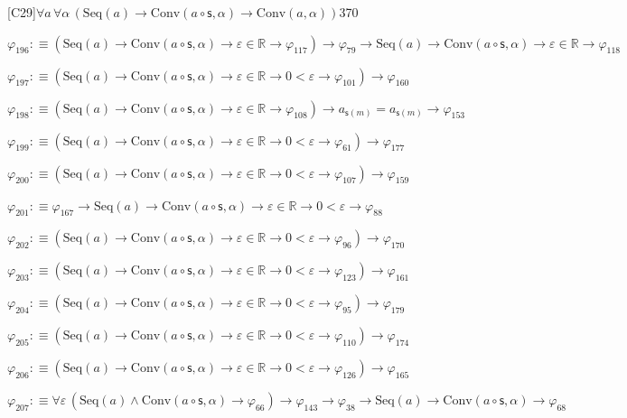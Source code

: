 \begin{fullproof}{[C29]}{$\forall a\,\forall \alpha\,(\mathrm{Seq}(a) \to \mathrm{Conv}(a \circ \mathsf{s},\alpha) \to \mathrm{Conv}(a,\alpha))$}{370}
\begin{abbrevlist}
\item $\varphi_{196} :\equiv (\mathrm{Seq}(a) \to \mathrm{Conv}(a \circ \mathsf{s},\alpha) \to \varepsilon \in \mathbb{R} \to \varphi_{117}) \to \varphi_{79} \to \mathrm{Seq}(a) \to \mathrm{Conv}(a \circ \mathsf{s},\alpha) \to \varepsilon \in \mathbb{R} \to \varphi_{118}$
\item $\varphi_{197} :\equiv (\mathrm{Seq}(a) \to \mathrm{Conv}(a \circ \mathsf{s},\alpha) \to \varepsilon \in \mathbb{R} \to 0 < \varepsilon \to \varphi_{101}) \to \varphi_{160}$
\item $\varphi_{198} :\equiv (\mathrm{Seq}(a) \to \mathrm{Conv}(a \circ \mathsf{s},\alpha) \to \varepsilon \in \mathbb{R} \to \varphi_{108}) \to a_{\mathsf{s}(m)} = a_{\mathsf{s}(m)} \to \varphi_{153}$
\item $\varphi_{199} :\equiv (\mathrm{Seq}(a) \to \mathrm{Conv}(a \circ \mathsf{s},\alpha) \to \varepsilon \in \mathbb{R} \to 0 < \varepsilon \to \varphi_{61}) \to \varphi_{177}$
\item $\varphi_{200} :\equiv (\mathrm{Seq}(a) \to \mathrm{Conv}(a \circ \mathsf{s},\alpha) \to \varepsilon \in \mathbb{R} \to 0 < \varepsilon \to \varphi_{107}) \to \varphi_{159}$
\item $\varphi_{201} :\equiv \varphi_{167} \to \mathrm{Seq}(a) \to \mathrm{Conv}(a \circ \mathsf{s},\alpha) \to \varepsilon \in \mathbb{R} \to 0 < \varepsilon \to \varphi_{88}$
\item $\varphi_{202} :\equiv (\mathrm{Seq}(a) \to \mathrm{Conv}(a \circ \mathsf{s},\alpha) \to \varepsilon \in \mathbb{R} \to 0 < \varepsilon \to \varphi_{96}) \to \varphi_{170}$
\item $\varphi_{203} :\equiv (\mathrm{Seq}(a) \to \mathrm{Conv}(a \circ \mathsf{s},\alpha) \to \varepsilon \in \mathbb{R} \to 0 < \varepsilon \to \varphi_{123}) \to \varphi_{161}$
\item $\varphi_{204} :\equiv (\mathrm{Seq}(a) \to \mathrm{Conv}(a \circ \mathsf{s},\alpha) \to \varepsilon \in \mathbb{R} \to 0 < \varepsilon \to \varphi_{95}) \to \varphi_{179}$
\item $\varphi_{205} :\equiv (\mathrm{Seq}(a) \to \mathrm{Conv}(a \circ \mathsf{s},\alpha) \to \varepsilon \in \mathbb{R} \to 0 < \varepsilon \to \varphi_{110}) \to \varphi_{174}$
\item $\varphi_{206} :\equiv (\mathrm{Seq}(a) \to \mathrm{Conv}(a \circ \mathsf{s},\alpha) \to \varepsilon \in \mathbb{R} \to 0 < \varepsilon \to \varphi_{126}) \to \varphi_{165}$
\item $\varphi_{207} :\equiv \forall \varepsilon\,(\mathrm{Seq}(a) \land \mathrm{Conv}(a \circ \mathsf{s},\alpha) \to \varphi_{66}) \to \varphi_{143} \to \varphi_{38} \to \mathrm{Seq}(a) \to \mathrm{Conv}(a \circ \mathsf{s},\alpha) \to \varphi_{68}$

\end{abbrevlist}
\end{fullproof}
